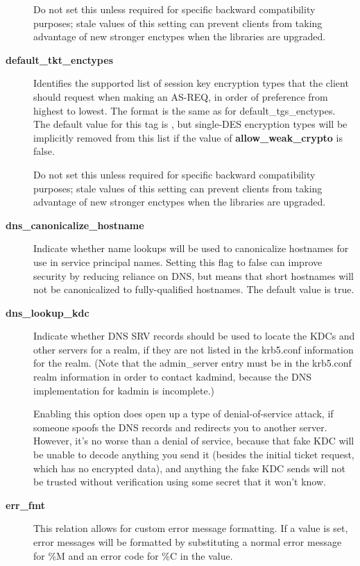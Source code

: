 \documentclass[letterpaper,10pt,english]{sphinxmanual}
\begin{document}
\begin{description}
Do not set this unless required for specific backward
compatibility purposes; stale values of this setting can prevent
clients from taking advantage of new stronger enctypes when the
libraries are upgraded.

\item[{\textbf{default\_tkt\_enctypes}}] \leavevmode
Identifies the supported list of session key encryption types that
the client should request when making an AS-REQ, in order of
preference from highest to lowest.  The format is the same as for
default\_tgs\_enctypes.  The default value for this tag is
, but single-DES encryption types will be implicitly
removed from this list if the value of \textbf{allow\_weak\_crypto} is
false.

Do not set this unless required for specific backward
compatibility purposes; stale values of this setting can prevent
clients from taking advantage of new stronger enctypes when the
libraries are upgraded.

\item[{\textbf{dns\_canonicalize\_hostname}}] \leavevmode
Indicate whether name lookups will be used to canonicalize
hostnames for use in service principal names.  Setting this flag
to false can improve security by reducing reliance on DNS, but
means that short hostnames will not be canonicalized to
fully-qualified hostnames.  The default value is true.

\item[{\textbf{dns\_lookup\_kdc}}] \leavevmode
Indicate whether DNS SRV records should be used to locate the KDCs
and other servers for a realm, if they are not listed in the
krb5.conf information for the realm.  (Note that the admin\_server
entry must be in the krb5.conf realm information in order to
contact kadmind, because the DNS implementation for kadmin is
incomplete.)

Enabling this option does open up a type of denial-of-service
attack, if someone spoofs the DNS records and redirects you to
another server.  However, it's no worse than a denial of service,
because that fake KDC will be unable to decode anything you send
it (besides the initial ticket request, which has no encrypted
data), and anything the fake KDC sends will not be trusted without
verification using some secret that it won't know.

\item[{\textbf{err\_fmt}}] \leavevmode
This relation allows for custom error message formatting.  If a
value is set, error messages will be formatted by substituting a
normal error message for \%M and an error code for \%C in the value.


\end{description}
\end{document}
